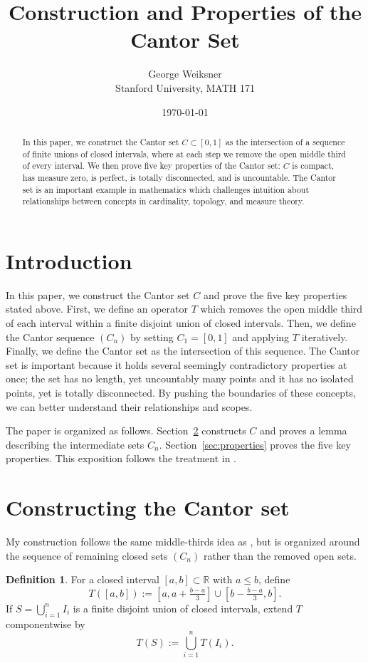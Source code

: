 \documentclass[11pt]{article}
\title{Construction and Properties of the Cantor Set}
\author{George Weiksner \\ \small Stanford University, MATH 171}
\date{\today}
\theoremstyle{plain}
\theoremstyle{definition}
\newtheorem{definition}[theorem]{Definition}
\theoremstyle{remark}
\newcommand{\R}{\mathbb{R}}
\begin{document}
\maketitle

\begin{abstract}
In this paper, we construct the Cantor set $C \subset [0,1]$ as the intersection of a sequence of finite unions of closed intervals, where at each step we remove the open middle third of every interval. We then prove five key properties of the Cantor set: $C$ is compact, has measure zero, is perfect, is totally disconnected, and is uncountable. The Cantor set is an important example in mathematics which challenges intuition about relationships between concepts in cardinality, topology, and measure theory. 
\end{abstract}

\section{Introduction}
In this paper, we construct the Cantor set $C$ and prove the five key properties stated above. First, we define an operator $T$ which removes the open middle third of each interval within a finite disjoint union of closed intervals. Then, we define the Cantor sequence $(C_n)$ by setting $C_1=[0,1]$ and applying $T$ iteratively. Finally, we define the Cantor set as the intersection of this sequence. The Cantor set is important because it holds several seemingly contradictory properties at once; the set has no length, yet uncountably many points and it has no isolated points, yet is totally disconnected. By pushing the boundaries of these concepts, we can better understand their relationships and scopes. 


The paper is organized as follows. Section~\ref{sec:construction} constructs $C$ and proves a lemma describing the intermediate sets $C_n$. Section~\ref{sec:properties} proves the five key properties. This exposition follows the treatment in \cite{johnsonbaugh}.

\section{Constructing the Cantor set}\label{sec:construction}
My construction follows the same middle-thirds idea as \cite{johnsonbaugh}, but is organized around the sequence of remaining closed sets $(C_n)$ rather than the removed open sets.
\begin{definition}
For a closed interval $[a,b] \subset \R$ with $a \le b$, define
\[
    T\left([a,b]\right) := \left[a, a + \tfrac{b-a}{3}\right] \cup \left[b - \tfrac{b-a}{3}, b\right].
\]
If $S = \bigcup_{i=1}^{n} I_i$ is a finite disjoint union of closed intervals, extend $T$ componentwise by
\[
    T(S) := \bigcup_{i=1}^{n} T(I_i).
\]
\end{definition}
\end{document}
